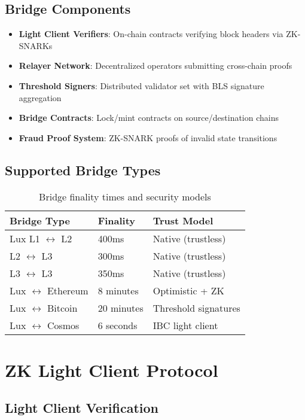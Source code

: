 \documentclass[11pt]{article}
\begin{document}
\subsection{Bridge Components}

\begin{itemize}[leftmargin=1.1em]
  \item \textbf{Light Client Verifiers}: On-chain contracts verifying block headers via ZK-SNARKs
  \item \textbf{Relayer Network}: Decentralized operators submitting cross-chain proofs
  \item \textbf{Threshold Signers}: Distributed validator set with BLS signature aggregation
  \item \textbf{Bridge Contracts}: Lock/mint contracts on source/destination chains
  \item \textbf{Fraud Proof System}: ZK-SNARK proofs of invalid state transitions
\end{itemize}

\subsection{Supported Bridge Types}

\begin{table}[h]
\centering
\begin{tabular}{lll}
\toprule
Bridge Type & Finality & Trust Model \\
\midrule
Lux L1 $\leftrightarrow$ L2 & 400ms & Native (trustless) \\
L2 $\leftrightarrow$ L3 & 300ms & Native (trustless) \\
L3 $\leftrightarrow$ L3 & 350ms & Native (trustless) \\
Lux $\leftrightarrow$ Ethereum & 8 minutes & Optimistic + ZK \\
Lux $\leftrightarrow$ Bitcoin & 20 minutes & Threshold signatures \\
Lux $\leftrightarrow$ Cosmos & 6 seconds & IBC light client \\
\bottomrule
\end{tabular}
\caption{Bridge finality times and security models}
\end{table}

\section{ZK Light Client Protocol}

\subsection{Light Client Verification}
\end{document}
